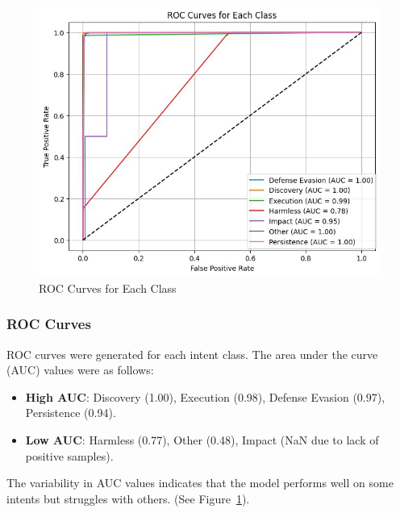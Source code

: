 \begin{figure}[h]
\begin{minipage}[c]{0.47\textwidth}
                    \includegraphics[width=\textwidth]{../figures/plots/section4/roc_curves.png}
                    \caption{ROC Curves for Each Class}
                    \label{fig:roc}
                \end{minipage}
            \end{figure}

        \subsubsection{ROC Curves \\}

            ROC curves were generated for each intent class. The area under the curve (AUC) values were as follows:
            
            \begin{itemize}
            
                \item \textbf{High AUC}: Discovery (1.00), Execution (0.98), Defense Evasion (0.97), Persistence (0.94).
                
                \item \textbf{Low AUC}: Harmless (0.77), Other (0.48), Impact (NaN due to lack of positive samples).
                
            \end{itemize}
            
            The variability in AUC values indicates that the model performs well on some intents but struggles with others. (See Figure~\ref{fig:roc}).

